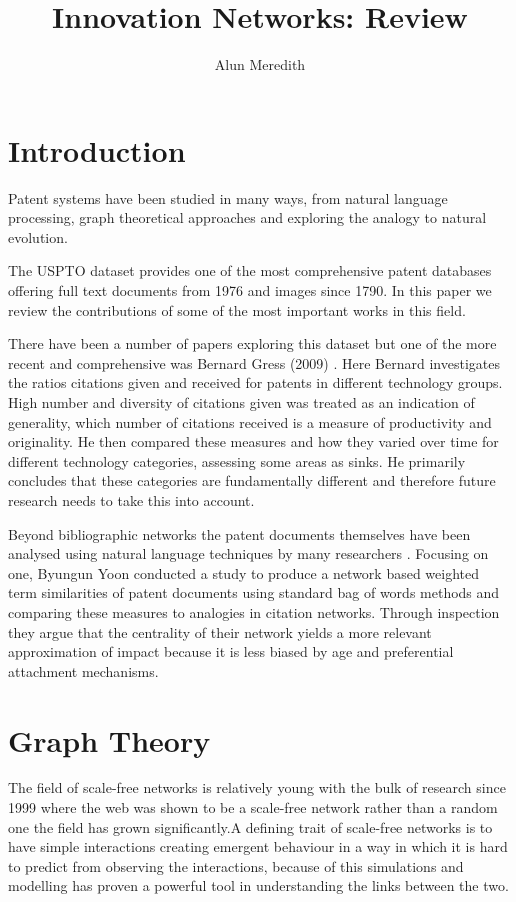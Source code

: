 \documentclass[12pt,journal,compsoc]{IEEEtran}
\begin{document}
\title{Innovation Networks: Review}
\author{Alun Meredith}
\maketitle

\section{Introduction}
Patent systems have been studied in many ways, from natural language processing, graph theoretical approaches and exploring the analogy to natural evolution. 

The USPTO dataset provides one of the most comprehensive patent databases offering full text documents from 1976 and images since 1790. In this paper we review the contributions of some of the most important works in this field. 

There have been a number of papers exploring this dataset but one of the more recent and comprehensive was Bernard Gress (2009) \cite{gress2010properties}. Here Bernard investigates the ratios citations given and received for patents in different technology groups. High number and diversity of citations given was treated as an indication of generality, which number of citations received is a measure of productivity and originality. He then compared these measures and how they varied over time for different technology categories, assessing some areas as sinks. He primarily concludes that these categories are fundamentally different and therefore future research needs to take this into account. 

Beyond bibliographic networks the patent documents themselves have been analysed using natural language techniques by many researchers  \cite{abbas2014literature}. Focusing on one, Byungun Yoon \cite{yoon2004text} conducted a study to produce a network based weighted term similarities of patent documents using standard bag of words methods and comparing these measures to analogies in citation networks. Through inspection they argue that the centrality of their network yields a more relevant approximation of impact because it is less biased by age and preferential attachment mechanisms. 

\section{Graph Theory}
The field of scale-free networks is relatively young with the bulk of research since 1999 where the web was shown to be a scale-free network rather than a random one the field has grown significantly\cite{barabasi1999emergence}.A defining trait of scale-free networks is to have simple interactions creating emergent behaviour in a way in which it is hard to predict from observing the interactions, because of this simulations and modelling has proven a powerful tool in understanding the links between the two. 
\end{document}
